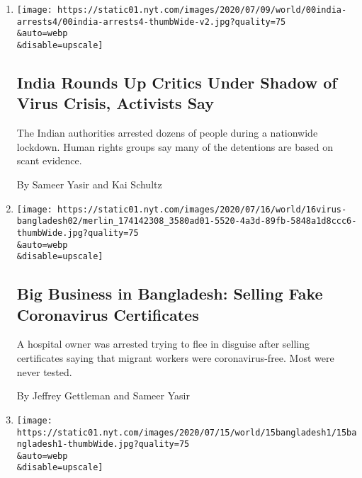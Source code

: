 \begin{enumerate}
\def\labelenumi{\arabic{enumi}.}
\item
  \href{/2020/07/19/world/asia/india-activists-arrests-riots-coronavirus.html}{}

  \texttt{[image: https://static01.nyt.com/images/2020/07/09/world/00india-arrests4/00india-arrests4-thumbWide-v2.jpg?quality=75\\\&auto=webp\\\&disable=upscale]}

  \hypertarget{india-rounds-up-critics-under-shadow-of-virus-crisis-activists-say}{%
  \subsection{India Rounds Up Critics Under Shadow of Virus Crisis,
  Activists
  Say}\label{india-rounds-up-critics-under-shadow-of-virus-crisis-activists-say}}

  The Indian authorities arrested dozens of people during a nationwide
  lockdown. Human rights groups say many of the detentions are based on
  scant evidence.

  By Sameer Yasir and Kai Schultz
\item
  \href{/2020/07/16/world/asia/coronavirus-bangladesh-italy-certificates.html}{}

  \texttt{[image: https://static01.nyt.com/images/2020/07/16/world/16virus-bangladesh02/merlin\_174142308\_3580ad01-5520-4a3d-89fb-5848a1d8ccc6-thumbWide.jpg?quality=75\\\&auto=webp\\\&disable=upscale]}

  \hypertarget{big-business-in-bangladesh-selling-fake-coronavirus-certificates}{%
  \subsection{Big Business in Bangladesh: Selling Fake Coronavirus
  Certificates}\label{big-business-in-bangladesh-selling-fake-coronavirus-certificates}}

  A hospital owner was arrested trying to flee in disguise after selling
  certificates saying that migrant workers were coronavirus-free. Most
  were never tested.

  By Jeffrey Gettleman and Sameer Yasir
\item
  \href{/2020/07/15/world/asia/monsoon-asia-bangladesh-india.html}{}

  \texttt{[image: https://static01.nyt.com/images/2020/07/15/world/15bangladesh1/15bangladesh1-thumbWide.jpg?quality=75\\\&auto=webp\\\&disable=upscale]}

  \hypertarget{monsoon-rains-pummel-south-asia-displacing-millions}{%
}
\end{enumerate}
